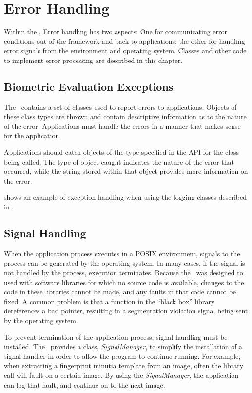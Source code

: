 %
%
\chapter{Error Handling}
\label{chp-error}

Within the \lname, Error handling has two aspects: One for communicating
error conditions out of the framework and back to applications; the other for
handling error signals from the environment and operating system. Classes
and other code to implement error processing are described in this chapter.

\section{Biometric Evaluation Exceptions}
The \lname\ contains a set of classes used to report errors to applications.
Objects of these class types are thrown and contain descriptive information as
to the nature of the error. Applications must handle the errors in a manner
that makes sense for the application.

Applications should catch objects of the type specified in the API for the
class being called. The type of object caught indicates the nature of the
error that occurred, while the string stored within that object
provides more information on the error.

 shows an example of exception handling when using
the logging classes described in .

\section{Signal Handling}
\label{sec-signalhandling}

When the application process executes in a POSIX environment, signals to the
process can be generated by the operating system. In many cases, if the
signal is not handled by the process, execution terminates. Because the
\lname\ was designed to used with software libraries for which no source code
is available, changes to the code in these libraries cannot be made, and any
faults in that code cannot be fixed. A common problem is that a function in
the ``black box'' library dereferences a bad pointer, resulting in a
segmentation violation signal being sent by the operating system.

To prevent termination of the application process, signal handling must be
installed. The \lname\ provides a class, {\em SignalManager}, to simplify
the installation of a signal handler in order to allow the program to
continue running. For example, when extracting a fingerprint minutia template
from an image, often the library call will fault on a certain image. By using
the {\em SignalManager}, the application can log that fault, and continue on
to the next image.

